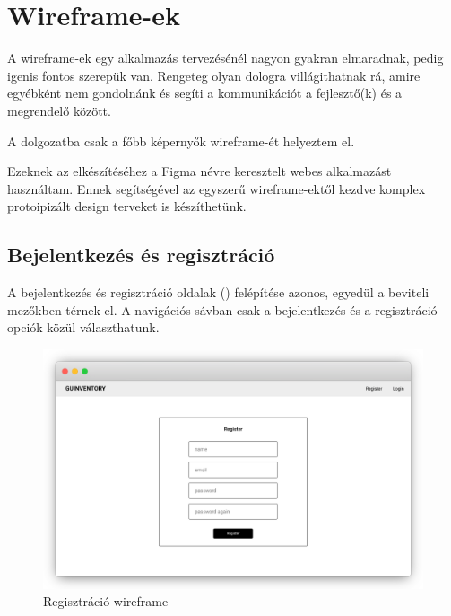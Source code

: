 \chapter{Wireframe-ek}

A wireframe-ek egy alkalmazás tervezésénél nagyon gyakran elmaradnak, pedig igenis fontos szerepük van.
Rengeteg olyan dologra villágithatnak rá, amire egyébként nem gondolnánk és segíti a kommunikációt a fejlesztő(k) és a megrendelő között.

A dolgozatba csak a főbb képernyők wireframe-ét helyeztem el.

Ezeknek az elkészítéséhez a Figma névre keresztelt webes alkalmazást használtam. 
Ennek segítségével az egyszerű wireframe-ektől kezdve komplex protoipizált design terveket is készíthetünk.

\section{Bejelentkezés és regisztráció}
A bejelentkezés és regisztráció oldalak () felépítése azonos, egyedül a beviteli mezőkben térnek el.
A navigációs sávban csak a bejelentkezés és a regisztráció opciók közül választhatunk.
\begin{figure}[!ht]
  \centering
  \includegraphics[width=150mm, keepaspectratio]{figures/wireframes/frame_registration.png}
  \caption{Regisztráció wireframe}
  \label{fig:RegistrationWireframe}
\end{figure}


